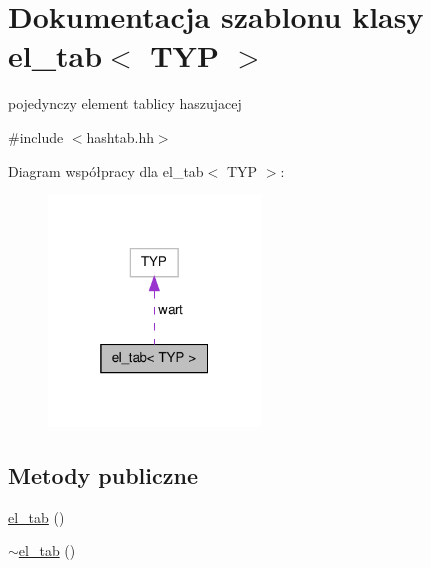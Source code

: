 \hypertarget{classel__tab}{\section{\-Dokumentacja szablonu klasy el\-\_\-tab$<$ \-T\-Y\-P $>$}
\label{classel__tab}
}


pojedynczy element tablicy haszujacej  




{\ttfamily \#include $<$hashtab.\-hh$>$}



\-Diagram współpracy dla el\-\_\-tab$<$ \-T\-Y\-P $>$\-:\nopagebreak
\begin{figure}[H]
\begin{center}
\leavevmode
\includegraphics[width=160pt]{classel__tab__coll__graph}
\end{center}
\end{figure}
\subsection*{\-Metody publiczne}
\begin{DoxyCompactItemize}
\item 
\hyperlink{classel__tab_a62c9bef278f50d1e5f41b3fd3773b61d}{el\-\_\-tab} ()
\item 
\hyperlink{classel__tab_acb9e9041b31f9b2cf8224b6b8cebd935}{$\sim$el\-\_\-tab} ()
\end{DoxyCompactItemize}
